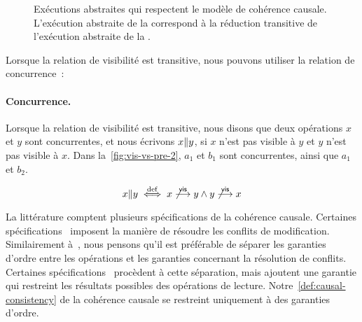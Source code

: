 \begin{figure}[htb]
\begin{subfigure}{\linewidth}
    \caption{}\label{fig:vis-vs-pre-2}
\end{subfigure}
\caption[Exécutions abstraites qui respectent le modèle de cohérence causale]{Exécutions abstraites qui respectent le modèle de cohérence causale.
L'exécution abstraite de la  correspond à la réduction transitive de l'exécution abstraite de la .}\label{fig:vis-vs-pre}
\end{figure}


Lorsque la relation de visibilité est transitive, nous pouvons utiliser la relation de concurrence~:

\paragraph{Concurrence.}
Lorsque la relation de visibilité est transitive, nous disons que deux opérations $x$ et $y$ sont concurrentes, et nous écrivons $x \| y$, si $x$ n'est pas visible à $y$ et $y$ n'est pas visible à $x$.
Dans la~\autoref{fig:vis-vs-pre-2}, $a_1$ et $b_1$ sont concurrentes, ainsi que $a_1$ et $b_2$.

\begin{equation*}
    x \| y \overset{\mathrm{def}}{\iff} x \not\overset{\mathsf{vis}}{\longrightarrow} y \land y \not\overset{\mathsf{vis}}{\longrightarrow} x
\end{equation*}

La littérature comptent plusieurs spécifications de la cohérence causale.
Certaines spécifications~\autocite{ahamad_1995_causal} imposent la manière de résoudre les conflits de modification.
Similairement à~\textcite{mahajan_2011_cac}, nous pensons qu'il est préférable de séparer les garanties d'ordre entre les opérations et les garanties concernant la résolution de conflits.
Certaines spécifications~\autocite{burckhardt_eventualconsistency_2014,viotti_consistency_2016} procèdent à cette séparation, mais ajoutent une garantie qui restreint les résultats possibles des opérations de lecture.
Notre~\autoref{def:causal-consistency} de la cohérence causale se restreint uniquement à des garanties d'ordre.

